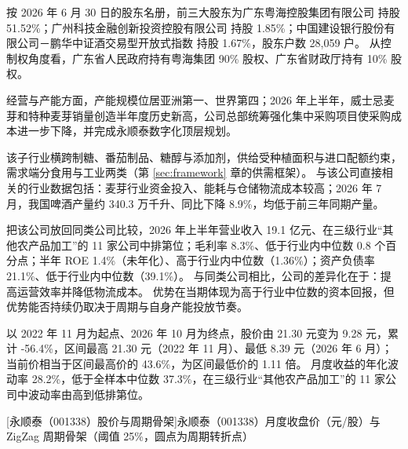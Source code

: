  按 2026 年 6 月 30 日的股东名册，前三大股东为广东粤海控股集团有限公司 持股 51.52\%；广州科技金融创新投资控股有限公司 持股 1.85\%；中国建设银行股份有限公司－鹏华中证酒交易型开放式指数 持股 1.67\%，股东户数 28,059 户。 从控制权角度看，广东省人民政府持有粤海集团 90\% 股权、广东省财政厅持有 10\% 股权。

 经营与产能方面，产能规模位居亚洲第一、世界第四；2026 年上半年，威士忌麦芽和特种麦芽销量创造半年度历史新高，公司总部统筹强化集中采购项目使采购成本进一步下降，并完成永顺泰数字化顶层规划。

 该子行业横跨制糖、番茄制品、糖醇与添加剂，供给受种植面积与进口配额约束，需求端分食用与工业两类（第 \ref{sec:framework} 章的供需框架）。 与该公司直接相关的行业数据包括：麦芽行业资金投入、能耗与仓储物流成本较高；2026 年 7 月，我国啤酒产量约 340.3 万千升、同比下降 8.9\%，均低于前三年同期产量。

 把该公司放回同类公司比较，2026 年上半年营业收入 19.1 亿元、在三级行业“其他农产品加工”的 11 家公司中排第位；毛利率 8.3\%、低于行业内中位数 0.8 个百分点；半年 ROE 1.4\%（未年化）、高于行业内中位数（1.36\%）；资产负债率 21.1\%、低于行业内中位数（39.1\%）。 与同类公司相比，公司的差异化在于：提高运营效率并降低物流成本。 优势在当期体现为高于行业中位数的资本回报，但优势能否持续仍取决于周期与自身产能投放节奏。

 以 2022 年 11 月为起点、2026 年 10 月为终点，股价由 21.30 元变为 9.28 元，累计 -56.4\%，区间最高 21.30 元（2022 年 11 月）、最低 8.39 元（2026 年 6 月）；当前价相当于区间最高价的 43.6\%，为区间最低价的 1.11 倍。 月度收益的年化波动率 28.2\%，低于全样本中位数 37.3\%，在三级行业“其他农产品加工”的 11 家公司中波动率由高到低排第位。

\begin{center}
\begin{minipage}{\textwidth}\centering
{}

[永顺泰（001338）股价与周期骨架]{永顺泰（001338）月度收盘价（元/股）与 ZigZag 周期骨架（阈值 25\%，圆点为周期转折点）}
\end{minipage}
\end{center}

